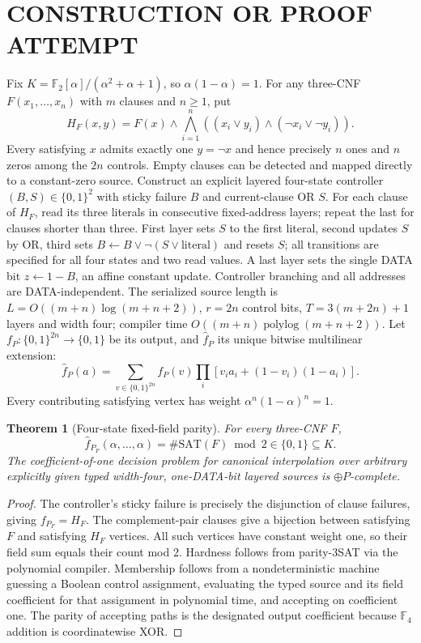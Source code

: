 \documentclass[11pt]{article}
\newtheorem{theorem}{Theorem}
\begin{document}
\section{CONSTRUCTION OR PROOF ATTEMPT}
Fix $K=\mathbb F_2[\alpha]/(\alpha^2+\alpha+1)$, so $\alpha(1-\alpha)=1$.
For any three-CNF $F(x_1,\ldots,x_n)$ with $m$ clauses and $n\ge1$, put
\[
 H_F(x,y)=F(x)\wedge\bigwedge_{i=1}^n
  ((x_i\lor y_i)\wedge(\neg x_i\lor\neg y_i)).
\]
Every satisfying $x$ admits exactly one $y=\neg x$ and hence precisely $n$ ones and $n$ zeros among the $2n$ controls. Empty clauses can be detected and mapped directly to a constant-zero source.
Construct an explicit layered four-state controller $(B,S)\in\{0,1\}^2$ with sticky failure $B$ and current-clause OR $S$. For each clause of $H_F$, read its three literals in consecutive fixed-address layers; repeat the last for clauses shorter than three. First layer sets $S$ to the first literal, second updates $S$ by OR, third sets $B\gets B\lor\neg(S\lor \mathrm{literal})$ and resets $S$; all transitions are specified for all four states and two read values. A last layer sets the single DATA bit $z\gets1-B$, an affine constant update. Controller branching and all addresses are DATA-independent. The serialized source length is $L=O((m+n)\log(m+n+2))$, $r=2n$ control bits, $T=3(m+2n)+1$ layers and width four; compiler time $O((m+n)\operatorname{polylog}(m+n+2))$.
Let $f_P:\{0,1\}^{2n}\to\{0,1\}$ be its output, and $\widehat f_P$ its unique bitwise multilinear extension:
\[
\widehat f_P(a)=\sum_{v\in\{0,1\}^{2n}}f_P(v)
\prod_i[v_i a_i+(1-v_i)(1-a_i)].
\]
Every contributing satisfying vertex has weight $\alpha^n(1-\alpha)^n=1$.
\begin{theorem}[Four-state fixed-field parity]
For every three-CNF $F$,
\[
\widehat f_{P_F}(\alpha,\ldots,\alpha)
=\#\mathrm{SAT}(F)\bmod2\in\{0,1\}\subseteq K.
\]
The coefficient-of-one decision problem for canonical interpolation over arbitrary explicitly given typed width-four, one-DATA-bit layered sources is $\oplus P$-complete.
\end{theorem}
\begin{proof}
The controller's sticky failure is precisely the disjunction of clause failures, giving $f_{P_F}=H_F$. The complement-pair clauses give a bijection between satisfying $F$ and satisfying $H_F$ vertices. All such vertices have constant weight one, so their field sum equals their count mod 2. Hardness follows from parity-3SAT via the polynomial compiler. Membership follows from a nondeterministic machine guessing a Boolean control assignment, evaluating the typed source and its field coefficient for that assignment in polynomial time, and accepting on coefficient one. The parity of accepting paths is the designated output coefficient because $\mathbb F_4$ addition is coordinatewise XOR.
\end{proof}
\end{document}

